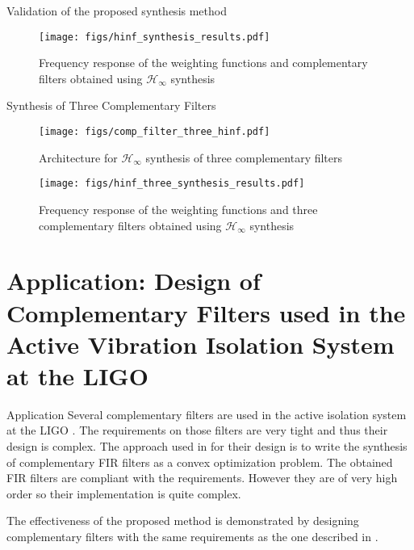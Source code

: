 \documentclass[t]{clean-beamer}
\begin{document}
\begin{frame}[label={sec:orgbb615dc}]{Validation of the proposed synthesis method}
\label{sec:hinf_example}
\begin{figure}[htbp]
\centering
\texttt{[image: figs/hinf\_synthesis\_results.pdf]}
\caption{\label{fig:hinf_synthesis_results}
Frequency response of the weighting functions and complementary filters obtained using \(\mathcal{H}_\infty\) synthesis}
\end{figure}
\end{frame}

\begin{frame}[label={sec:org1e9511a}]{Synthesis of Three Complementary Filters}
\label{sec:hinf_three_comp_filters}
\begin{figure}[htbp]
\centering
\texttt{[image: figs/comp\_filter\_three\_hinf.pdf]}
\caption{\label{fig:comp_filter_three_hinf}
Architecture for \(\mathcal{H}_\infty\) synthesis of three complementary filters}
\end{figure}

\begin{figure}[htbp]
\centering
\texttt{[image: figs/hinf\_three\_synthesis\_results.pdf]}
\caption{\label{fig:hinf_three_synthesis_results}
Frequency response of the weighting functions and three complementary filters obtained using \(\mathcal{H}_\infty\) synthesis}
\end{figure}
\end{frame}

\section{Application: Design of Complementary Filters used in the Active Vibration Isolation System at the LIGO}
\label{sec:org282c8fb}
\label{sec:application_ligo}
\begin{frame}[label={sec:org17c24af}]{Application}
Several complementary filters are used in the active isolation system at the LIGO \cite{hua05_low_ligo,hua04_polyp_fir_compl_filter_contr_system}.
The requirements on those filters are very tight and thus their design is complex.
The approach used in \cite{hua05_low_ligo} for their design is to write the synthesis of complementary FIR filters as a convex optimization problem.
The obtained FIR filters are compliant with the requirements. However they are of very high order so their implementation is quite complex.

The effectiveness of the proposed method is demonstrated by designing complementary filters with the same requirements as the one described in \cite{hua05_low_ligo}.
\end{frame}
\end{document}
